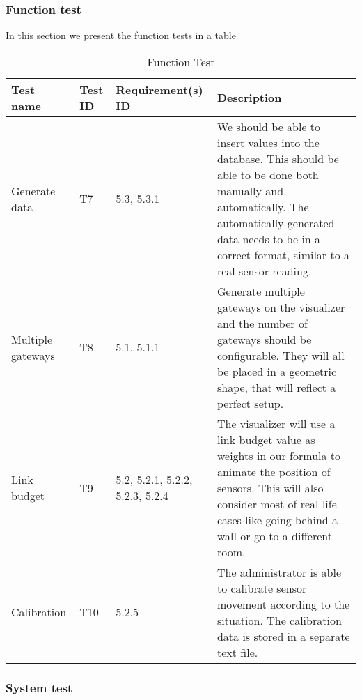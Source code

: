 \documentclass[../document]{subfiles}
\begin{document}
\subsubsection{Function test}

In this section we present the function tests in a table

\begin{table}[H]
\caption{Function Test}
\centering
\begin{tabularx}{\textwidth}{|L{2cm}|l|L{2.2cm}|X|}
	\hline
	Test name
	&Test ID
	&Requirement(s) ID
	&Description
	\\ \hline Generate data
	&T7
	&5.3, 5.3.1
	&We should be able to insert values into the database. This should be able to be done both manually and automatically. The automatically generated data needs to be in a correct format, similar to a real sensor reading.
	\\ \hline Multiple gateways
	&T8
	&5.1, 5.1.1
	&Generate multiple gateways on the visualizer and the number of gateways should be configurable. They will all be placed in a geometric shape, that will reflect a perfect setup.
	\\ \hline Link budget
	&T9
	&5.2, 5.2.1, 5.2.2, 5.2.3, 5.2.4
	&The visualizer will use a link budget value as weights in our formula to animate the position of sensors. This will also consider most of real life cases like going behind a wall or go to a different room.
	\\ \hline Calibration
	&T10
	&5.2.5
	&The administrator is able to calibrate sensor movement according to the situation. The calibration data is stored in a separate text file.
	\\ \hline 
\end{tabularx}
\end{table}

\subsubsection{System test}
\end{document}
